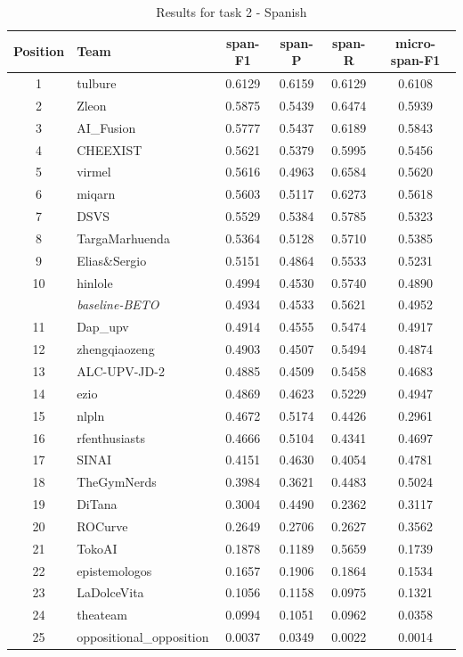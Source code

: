 \documentclass{Configuration_Files/PoliMi3i_thesis}
\begin{document}
\begin{table}[H]
\small
\renewcommand{\arraystretch}{0.8} %
\begin{tabular}{clcccc}
\hline
\textbf{Position} & \textbf{Team} & \textbf{span-F1} & \textbf{span-P} & \textbf{span-R} & \textbf{micro-span-F1} \\ \hline
1 & tulbure & 0.6129 & 0.6159 & 0.6129 & 0.6108 \\
2 & Zleon & 0.5875 & 0.5439 & 0.6474 & 0.5939 \\
3 & AI\_Fusion & 0.5777 & 0.5437 & 0.6189 & 0.5843 \\
4 & CHEEXIST & 0.5621 & 0.5379 & 0.5995 & 0.5456 \\
5 & virmel & 0.5616 & 0.4963 & 0.6584 & 0.5620 \\
6 & miqarn & 0.5603 & 0.5117 & 0.6273 & 0.5618 \\
7 & DSVS & 0.5529 & 0.5384 & 0.5785 & 0.5323 \\
8 & TargaMarhuenda & 0.5364 & 0.5128 & 0.5710 & 0.5385 \\
9 & Elias\&Sergio & 0.5151 & 0.4864 & 0.5533 & 0.5231 \\
10 & hinlole & 0.4994 & 0.4530 & 0.5740 & 0.4890 \\
& \textit{baseline-BETO} & 0.4934 & 0.4533 & 0.5621 & 0.4952 \\
11 & Dap\_upv & 0.4914 & 0.4555 & 0.5474 & 0.4917 \\
12 & zhengqiaozeng & 0.4903 & 0.4507 & 0.5494 & 0.4874 \\
13 & ALC-UPV-JD-2 & 0.4885 & 0.4509 & 0.5458 & 0.4683 \\
14 & ezio & 0.4869 & 0.4623 & 0.5229 & 0.4947 \\
15 & nlpln & 0.4672 & 0.5174 & 0.4426 & 0.2961 \\
16 & rfenthusiasts & 0.4666 & 0.5104 & 0.4341 & 0.4697 \\
17 & SINAI & 0.4151 & 0.4630 & 0.4054 & 0.4781 \\
18 & TheGymNerds & 0.3984 & 0.3621 & 0.4483 & 0.5024 \\
19 & DiTana & 0.3004 & 0.4490 & 0.2362 & 0.3117 \\
20 & ROCurve & 0.2649 & 0.2706 & 0.2627 & 0.3562 \\
21 & TokoAI & 0.1878 & 0.1189 & 0.5659 & 0.1739 \\
22 & epistemologos & 0.1657 & 0.1906 & 0.1864 & 0.1534 \\
23 & LaDolceVita & 0.1056 & 0.1158 & 0.0975 & 0.1321 \\
24 & theateam & 0.0994 & 0.1051 & 0.0962 & 0.0358 \\
25 & oppositional\_opposition & 0.0037 & 0.0349 & 0.0022 & 0.0014 \\
\hline
\end{tabular}
\caption{\small Results for task 2 - Spanish \cite{korencic2024oppositional}}
\label{tab:task2_results_es_full}
\end{table}
\FloatBarrier
\end{document}
